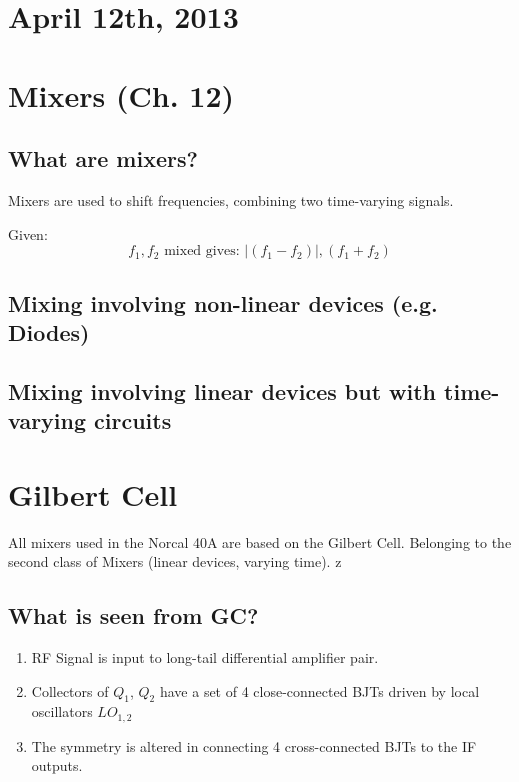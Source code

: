 \section{April 12th, 2013}
\section{Mixers (Ch. 12)}
\subsection{What are mixers?}
Mixers are used to shift frequencies, combining two time-varying signals.


Given:
\[
  f_1,f_2 \text{ mixed gives: } |(f_1-f_2)|,(f_1+f_2)
\]

\subsection{Mixing involving non-linear devices (e.g. Diodes)}

\subsection{Mixing involving linear devices but with time-varying circuits}

\section{Gilbert Cell}
All mixers used in the Norcal 40A are based on the Gilbert Cell. Belonging to
the second class of Mixers (linear devices, varying time).
z
\begin{figure}
  \centering
\end{figure}

\subsection{What is seen from GC?}
\begin{enumerate}
  \item RF Signal is input to long-tail 
    differential amplifier pair.
  \item Collectors of $Q_1$, $Q_2$ have a set of 4
    close-connected BJTs driven by local oscillators
    $LO_{1,2}$
  \item The symmetry is altered in connecting 4
    cross-connected BJTs to the IF outputs.
\end{enumerate}

